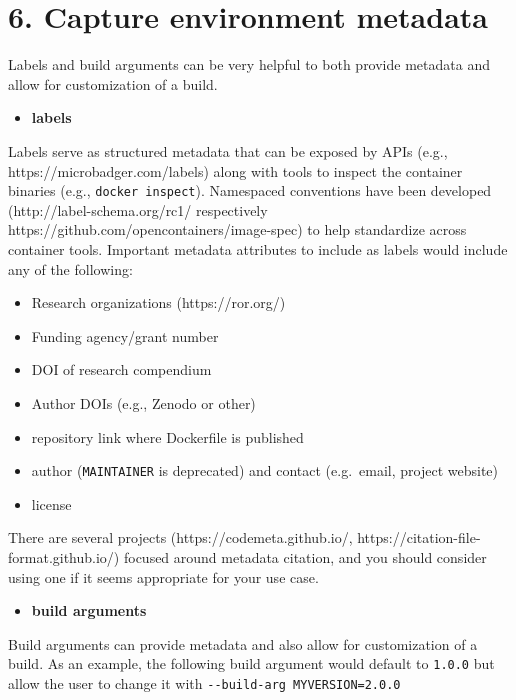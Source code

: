 \documentclass[10pt,letterpaper]{article}
\providecommand{\tightlist}{%
  \setlength{\itemsep}{0pt}\setlength{\parskip}{0pt}}
\begin{document}
\hypertarget{capture-environment-metadata}{%
\section*{6. Capture environment
metadata}\label{capture-environment-metadata}}

Labels and build arguments can be very helpful to both provide metadata
and allow for customization of a build.

\begin{itemize}
\tightlist
\item
  \textbf{labels}
\end{itemize}

Labels serve as structured metadata that can be exposed by APIs (e.g.,
https://microbadger.com/labels) along with tools to inspect the
container binaries (e.g., \texttt{docker\ inspect}). Namespaced
conventions have been developed (http://label-schema.org/rc1/
respectively https://github.com/opencontainers/image-spec) to help
standardize across container tools. Important metadata attributes to
include as labels would include any of the following:

\begin{itemize}
\tightlist
\item
  Research organizations (https://ror.org/)
\item
  Funding agency/grant number
\item
  DOI of research compendium
\item
  Author DOIs (e.g., Zenodo or other)
\item
  repository link where Dockerfile is published
\item
  author (\texttt{MAINTAINER} is deprecated) and contact (e.g.~email,
  project website)
\item
  license
\end{itemize}

There are several projects (https://codemeta.github.io/,
https://citation-file-format.github.io/) focused around metadata
citation, and you should consider using one if it seems appropriate for
your use case.

\begin{itemize}
\tightlist
\item
  \textbf{build arguments}
\end{itemize}

Build arguments can provide metadata and also allow for customization of
a build. As an example, the following build argument would default to
\texttt{1.0.0} but allow the user to change it with
\texttt{-\/-build-arg\ MYVERSION=2.0.0}
\end{document}
